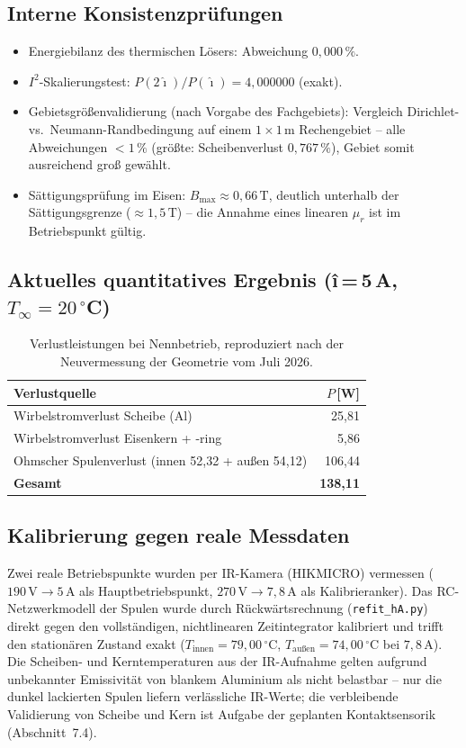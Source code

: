 \documentclass[a4paper,11pt]{article}
\begin{document}
\subsection{Interne Konsistenzprüfungen}
\begin{itemize}[nosep]
  \item Energiebilanz des thermischen Lösers: Abweichung $0{,}000\,\%$.
  \item $I^2$-Skalierungstest: $P(2\hat\imath)/P(\hat\imath) = 4{,}000000$
        (exakt).
  \item Gebietsgrößenvalidierung (nach Vorgabe des Fachgebiets): Vergleich
        Dirichlet- vs.\ Neumann-Randbedingung auf einem $1\times1\,\mathrm m$
        Rechengebiet -- alle Abweichungen $<1\,\%$ (größte: Scheibenverlust
        $0{,}767\,\%$), Gebiet somit ausreichend groß gewählt.
  \item Sättigungsprüfung im Eisen: $B_{\max}\approx 0{,}66\,\mathrm T$,
        deutlich unterhalb der Sättigungsgrenze ($\approx 1{,}5\,\mathrm T$)
        -- die Annahme eines linearen $\mu_r$ ist im Betriebspunkt gültig.
\end{itemize}

\subsection{Aktuelles quantitatives Ergebnis (î\,=\,5\,A, $T_\infty=20\,^\circ$C)}
\begin{table}[h]
\centering
\begin{tabular}{@{}lr@{}}
\toprule
Verlustquelle & $P$\,[W] \\
\midrule
Wirbelstromverlust Scheibe (Al) & 25{,}81 \\
Wirbelstromverlust Eisenkern + -ring & 5{,}86 \\
Ohmscher Spulenverlust (innen 52{,}32 + außen 54{,}12) & 106{,}44 \\
\midrule
\textbf{Gesamt} & \textbf{138{,}11} \\
\bottomrule
\end{tabular}
\caption{Verlustleistungen bei Nennbetrieb, reproduziert nach der
Neuvermessung der Geometrie vom Juli 2026.}
\end{table}

\subsection{Kalibrierung gegen reale Messdaten}
Zwei reale Betriebspunkte wurden per IR-Kamera (HIKMICRO) vermessen
($190\,\mathrm V\to5\,\mathrm A$ als Hauptbetriebspunkt,
$270\,\mathrm V\to7{,}8\,\mathrm A$ als Kalibrieranker). Das
RC-Netzwerkmodell der Spulen wurde durch Rückwärtsrechnung
(\texttt{refit\_hA.py}) direkt gegen den vollständigen, nichtlinearen
Zeitintegrator kalibriert und trifft den stationären Zustand exakt
($T_{\mathrm{innen}}=79{,}00\,^\circ$C, $T_{\mathrm{außen}}=74{,}00\,^\circ$C
bei $7{,}8\,\mathrm A$). Die Scheiben- und Kerntemperaturen aus der
IR-Aufnahme gelten aufgrund unbekannter Emissivität von blankem Aluminium
als nicht belastbar -- nur die dunkel lackierten Spulen liefern verlässliche
IR-Werte; die verbleibende Validierung von Scheibe und Kern ist Aufgabe der
geplanten Kontaktsensorik (Abschnitt~7.4).
\end{document}

